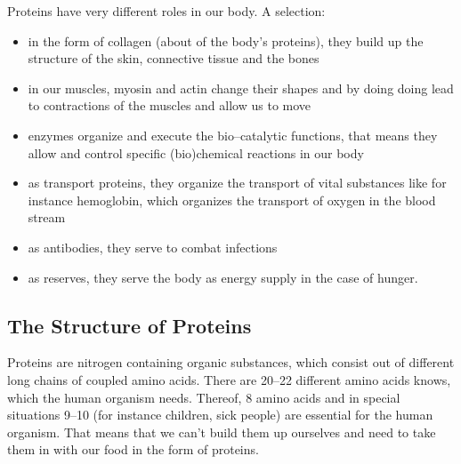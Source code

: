 \documentclass[../main.tex]{subfiles}
\begin{document}
Proteins have very different roles in our body. A selection:
\begin{itemize}
\item in the form of collagen (about  of the body's proteins), they build up the structure of the skin, connective tissue and the bones
\item in our muscles, myosin and actin change their shapes and by doing doing lead to contractions of the muscles and allow us to move
\item enzymes organize and execute the bio--catalytic functions, that means they allow  and control specific (bio)chemical reactions in our body
\item as transport proteins, they organize the transport of vital substances like for instance hemoglobin, which organizes the transport of oxygen in the blood stream
\item as antibodies, they serve to combat infections
  \item as reserves, they serve the body as energy supply in the case of hunger.
  \end{itemize}

  \subsection{The Structure of Proteins}

  Proteins are nitrogen containing organic substances, which consist out of different long chains of coupled amino acids.
  There are 20--22 different amino acids knows, which the human organism needs.
  Thereof, 8 amino acids and in special situations 9--10 (for instance children, sick people) are essential for the human organism.
  That means that we can't build them up ourselves and need to take them in with our food in the form of proteins.
\end{document}
